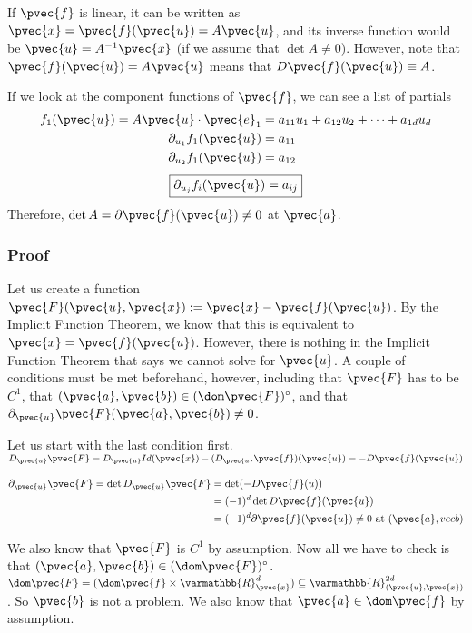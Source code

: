 \documentclass[11 pt, twoside]{article}
\begin{document}
If $\pvec{f}$ is linear, it can be written as $\pvec{x} = \pvec{f}(\pvec{u}) =
A\pvec{u}$, and its inverse function would be $\pvec{u} = A^{-1}\pvec{x}$ (if we
assume that $\det A \neq 0$). However, note that $\pvec{f}(\pvec{u}) = A\pvec{u}$
means that $D\pvec{f}(\pvec{u}) \equiv A$.

If we look at the component functions of $\pvec{f}$, we can see a list of
partials
\begin{align*}
f_1(\pvec{u}) = A\pvec{u} \cdot \pvec{e}_1 &= a_{11}u_1 + a_{12}u_2 + \dots + a_{1d}u_d\\
\partial_{u_1}f_1(\pvec{u}) &= a_{11}\\
\partial_{u_2}f_1(\pvec{u}) &= a_{12}\\
\end{align*}
\[
\boxed{\partial_{u_j} f_i (\pvec{u}) = a_{ij}}
\]
Therefore, $\det A = \partial \pvec{f}(\pvec{u}) \neq 0$ at $\pvec{a}$.

\subsubsection{Proof}

Let us create a function $\pvec{F} (\pvec{u}, \pvec{x}) := \pvec{x} -
\pvec{f}(\pvec{u})$. By the Implicit Function Theorem, we know that this is
equivalent to $\pvec{x} = \pvec{f}(\pvec{u})$. However, there is nothing in the
Implicit Function Theorem that says we cannot solve for $\pvec{u}$. A couple of
conditions must be met beforehand, however, including that $\pvec{F}$ has to be
$C^1$, that $(\pvec{a}, \pvec{b}) \in (\dom \pvec{F})^\circ$, and that
$\partial_{\pvec{u}} \pvec{F}(\pvec{a}, \pvec{b}) \neq 0$.

Let us start with the last condition first. $D_{\pvec{u}} \pvec{F} = D_{\pvec{u}}
Id(\pvec{x}) - (D_{\pvec{u}}\pvec{f})(\pvec{u}) = -D\pvec{f}(\pvec{u})$

\begin{align*}
\partial_{\pvec{u}}\pvec{F} = \det D_{\pvec{u}}\pvec{F} &= \det (-D\pvec{f}(u))\\
&= (-1)^d \det
D\pvec{f}(\pvec{u})\\
&= (-1)^d \partial \pvec{f}(\pvec{u}) \neq 0 \text{ at } (\pvec{a}, vec{b})\\
\end{align*}

We also know that $\pvec{F}$ is $C^1$ by assumption. Now all we have to check is
that $(\pvec{a}, \pvec{b}) \in (\dom \pvec{F})^\circ$. $\dom \pvec{F} = (\dom
\pvec{f} \times \varmathbb{R}^d_{\pvec{x}}) \subseteq
\varmathbb{R}^{2d}_{(\pvec{u}, \pvec{x})}$. So $\pvec{b}$ is not a problem. We also
know that $\pvec{a} \in \dom \pvec{f}$ by assumption.
\end{document}
